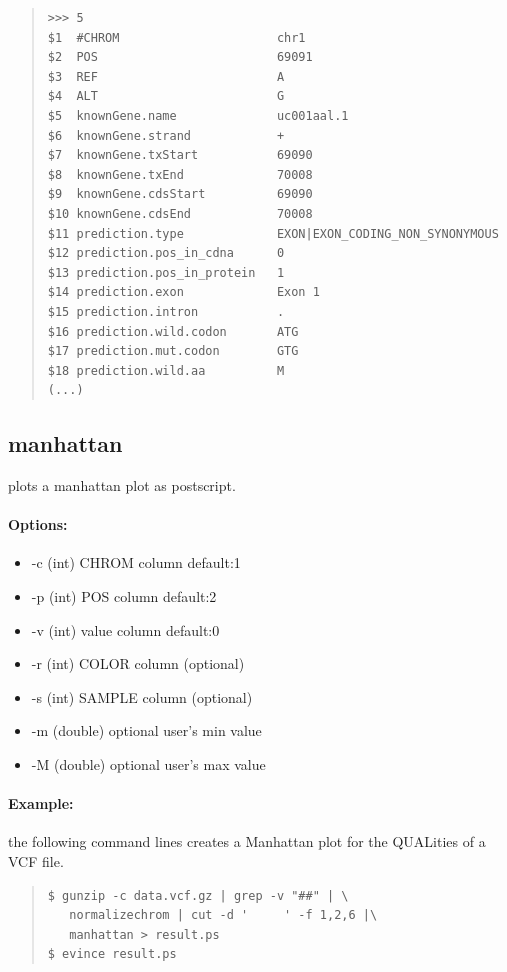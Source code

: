 \documentclass[12pt]{article}
\begin{document}
\begin{quote}
\begin{verbatim}
>>>	5
$1	#CHROM                   	chr1
$2	POS                      	69091
$3	REF                      	A
$4	ALT                      	G
$5	knownGene.name           	uc001aal.1
$6	knownGene.strand         	+
$7	knownGene.txStart        	69090
$8	knownGene.txEnd          	70008
$9	knownGene.cdsStart       	69090
$10	knownGene.cdsEnd         	70008
$11	prediction.type          	EXON|EXON_CODING_NON_SYNONYMOUS
$12	prediction.pos_in_cdna   	0
$13	prediction.pos_in_protein	1
$14	prediction.exon          	Exon 1
$15	prediction.intron        	.
$16	prediction.wild.codon    	ATG
$17	prediction.mut.codon     	GTG
$18	prediction.wild.aa       	M
(...)
\end{verbatim}
\end{quote}

\subsection{manhattan}
plots a manhattan plot as postscript.
\paragraph{Options:}
\begin{itemize}
\item-c (int) CHROM column default:1
\item-p (int) POS column default:2
\item-v (int) value column default:0
\item-r (int) COLOR column (optional)
\item-s (int) SAMPLE column (optional)
\item-m (double) optional user's min value
\item-M (double) optional user's max value
\end{itemize}

\paragraph{Example:}
the following command lines creates a Manhattan plot for the QUALities of a VCF file.
\begin{quote}
\begin{verbatim}
$ gunzip -c data.vcf.gz | grep -v "##" | \
   normalizechrom | cut -d '     ' -f 1,2,6 |\
   manhattan > result.ps
$ evince result.ps
\end{verbatim}
\end{quote}
\end{document}
